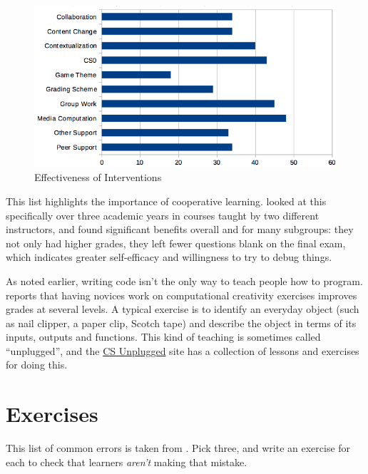 \begin{figure}
\centering
\includegraphics{../docs/fig/interventions.png}
\caption{Effectiveness of Interventions}
\label{f:pck-interventions}
\end{figure}

This list highlights the importance of cooperative learning.
\cite{Beck2013} looked at this specifically over three academic years
in courses taught by two different instructors, and found significant
benefits overall and for many subgroups: they not only had higher
grades, they left fewer questions blank on the final exam, which
indicates greater self-efficacy and willingness to try to debug
things.

As noted earlier, writing code isn't the only way to teach people how
to program.  \cite{Shel2017} reports that having novices work on
computational creativity exercises improves grades at several levels.
A typical exercise is to identify an everyday object (such as nail
clipper, a paper clip, Scotch tape) and describe the object in terms
of its inputs, outputs and functions.  This kind of teaching is
sometimes called ``unplugged'', and the
\href{https://csunplugged.org/en/}{CS Unplugged} site has a collection
of lessons and exercises for doing this.

\section{Exercises}\label{s:pck-exercises}


This list of common errors is taken from \cite{Sirk2012}.  Pick three,
and write an exercise for each to check that learners \emph{aren't}
making that mistake.

